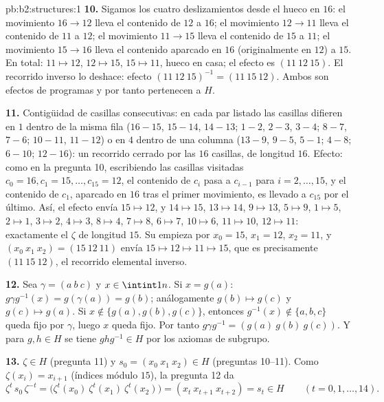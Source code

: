 \begin{solution}{pb:b2:structures:1}
\textbf{10.} Sigamos los cuatro deslizamientos desde el hueco en
$16$: el movimiento $16 \to 12$ lleva el contenido de $12$ a $16$;
el movimiento $12 \to 11$ lleva el contenido de $11$ a $12$; el
movimiento $11 \to 15$ lleva el contenido de $15$ a $11$; el
movimiento $15 \to 16$ lleva el contenido aparcado en $16$
(originalmente en $12$) a $15$. En total: $11 \mapsto 12$, $12
\mapsto 15$, $15 \mapsto 11$, hueco en casa; el efecto es $(11\
12\ 15)$. El recorrido inverso lo deshace: efecto $(11\ 12\
15)^{-1} = (11\ 15\ 12)$. Ambos son efectos de programas y por
tanto pertenecen a $H$.

\textbf{11.} Contigüidad de casillas consecutivas: en cada par
listado las casillas difieren en $1$ dentro de la misma fila
($16{-}15$, $15{-}14$, $14{-}13$; $1{-}2$, $2{-}3$, $3{-}4$;
$8{-}7$, $7{-}6$; $10{-}11$, $11{-}12$) o en $4$ dentro de una
columna ($13{-}9$, $9{-}5$, $5{-}1$; $4{-}8$; $6{-}10$;
$12{-}16$): un recorrido cerrado por las $16$ casillas, de
longitud $16$. Efecto: como en la pregunta 10, escribiendo las
casillas visitadas $c_0 = 16, c_1 = 15, \dots, c_{15} = 12$, el
contenido de $c_i$ pasa a $c_{i-1}$ para $i = 2, \dots, 15$, y el
contenido de $c_1$, aparcado en $16$ tras el primer movimiento, es
llevado a $c_{15}$ por el último. Así, el efecto envía $15 \mapsto
12$, y $14 \mapsto 15$, $13 \mapsto 14$, $9 \mapsto 13$, $5 \mapsto
9$, $1 \mapsto 5$, $2 \mapsto 1$, $3 \mapsto 2$, $4 \mapsto 3$, $8
\mapsto 4$, $7 \mapsto 8$, $6 \mapsto 7$, $10 \mapsto 6$, $11
\mapsto 10$, $12 \mapsto 11$: exactamente el  $\zeta$ de
longitud $15$. Su \omterm{def:b2:structures:generated}{orden}  empieza por $x_0 = 15$, $x_1 =
12$, $x_2 = 11$, y $(x_0\ x_1\ x_2) = (15\ 12\ 11)$ envía $15
\mapsto 12 \mapsto 11 \mapsto 15$, que es precisamente $(11\ 15\
12)$, el recorrido elemental inverso.

\textbf{12.} Sea $\gamma = (a\ b\ c)$ y $x \in \intint1n$. Si $x =
g(a)$: $g\gamma g^{-1}(x) = g(\gamma(a)) = g(b)$; análogamente
$g(b) \mapsto g(c)$ y $g(c) \mapsto g(a)$. Si $x \notin \{g(a),
g(b), g(c)\}$, entonces $g^{-1}(x) \notin \{a,b,c\}$ queda fijo por
$\gamma$, luego $x$ queda fijo. Por tanto $g\gamma g^{-1} = (g(a)\
g(b)\ g(c))$. Y para $g, h \in H$ se tiene $ghg^{-1} \in H$ por los
axiomas de subgrupo.

\textbf{13.} $\zeta \in H$ (pregunta 11) y $s_0 = (x_0\ x_1\ x_2)
\in H$ (preguntas 10--11). Como $\zeta(x_i) = x_{i+1}$ (índices
módulo $15$), la pregunta 12 da
\[
\zeta^{t}\,s_0\,\zeta^{-t}
= \bigl(\zeta^t(x_0)\ \zeta^t(x_1)\ \zeta^t(x_2)\bigr)
= (x_t\ x_{t+1}\ x_{t+2}) = s_t \in H
\qquad (t = 0, 1, \dots, 14).
\]


\end{solution}
